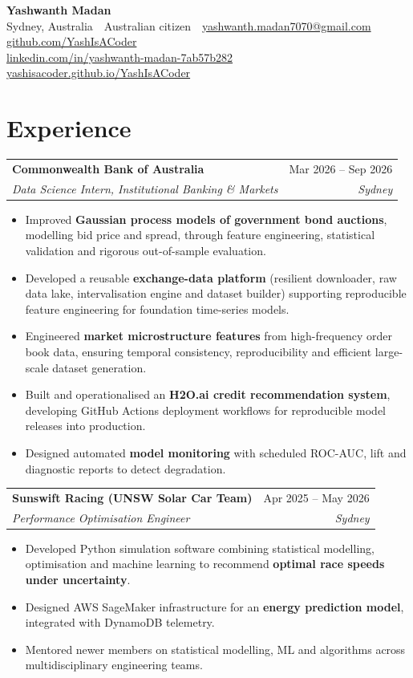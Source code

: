 \documentclass[10pt]{article}
\makeatletter
\newcommand{\role}[4]{%
  \vspace{3.5pt}%
  \begin{tabularx}{\linewidth}{@{}X r@{}}
    \textbf{#1} & #2 \\
    \textit{#3} & \textit{\color{muted}#4} \\
  \end{tabularx}\vspace{-1pt}}
\makeatother
\begin{document}
\begin{center}
  {\fontsize{24}{28}\selectfont\bfseries Yashwanth Madan}\\[5pt]
  {\small
  Sydney, Australia \,\textbullet\, Australian citizen \,\textbullet\,
  \href{mailto:yashwanth.madan7070@gmail.com}{yashwanth.madan7070@gmail.com} \,\textbullet\,
  \href{https://github.com/YashIsACoder}{github.com/YashIsACoder}\\[1pt]
  \href{https://www.linkedin.com/in/yashwanth-madan-7ab57b282}{linkedin.com/in/yashwanth-madan-7ab57b282} \,\textbullet\,
  \href{https://yashisacoder.github.io/YashIsACoder/}{yashisacoder.github.io/YashIsACoder}}
\end{center}
\vspace{-6pt}

\section{Experience}

\role{Commonwealth Bank of Australia}{Mar 2026 -- Sep 2026}{Data Science Intern, Institutional Banking \& Markets}{Sydney}
\begin{itemize}
  \item Improved \textbf{Gaussian process models of government bond auctions}, modelling bid price and spread, through feature engineering, statistical validation and rigorous out-of-sample evaluation.
  \item Developed a reusable \textbf{exchange-data platform} (resilient downloader, raw data lake, intervalisation engine and dataset builder) supporting reproducible feature engineering for foundation time-series models.
  \item Engineered \textbf{market microstructure features} from high-frequency order book data, ensuring temporal consistency, reproducibility and efficient large-scale dataset generation.
  \item Built and operationalised an \textbf{H2O.ai credit recommendation system}, developing GitHub Actions deployment workflows for reproducible model releases into production.
  \item Designed automated \textbf{model monitoring} with scheduled ROC-AUC, lift and diagnostic reports to detect degradation.
\end{itemize}

\role{Sunswift Racing (UNSW Solar Car Team)}{Apr 2025 -- May 2026}{Performance Optimisation Engineer}{Sydney}
\begin{itemize}
  \item Developed Python simulation software combining statistical modelling, optimisation and machine learning to recommend \textbf{optimal race speeds under uncertainty}.
  \item Designed AWS SageMaker infrastructure for an \textbf{energy prediction model}, integrated with DynamoDB telemetry.
  \item Mentored newer members on statistical modelling, ML and algorithms across multidisciplinary engineering teams.
\end{itemize}
\end{document}
